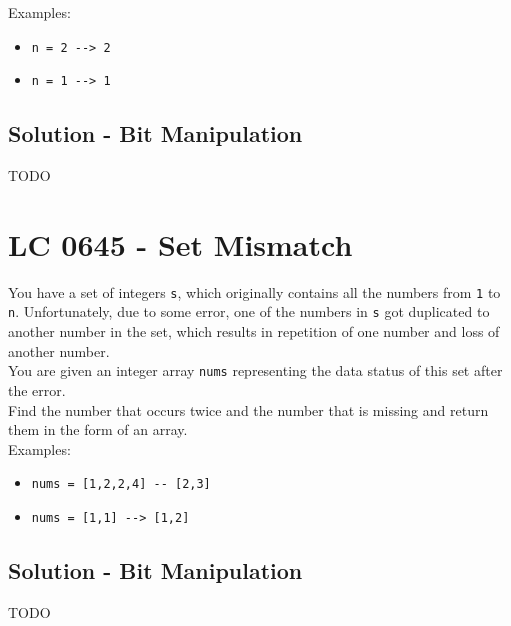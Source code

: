 Examples:
\begin{itemize}
\item {\colorbox{CodeBackground}{\lstinline|n = 2 --> 2|}}
\item {\colorbox{CodeBackground}{\lstinline|n = 1 --> 1|}}
\end{itemize}

\subsection*{Solution - Bit Manipulation}
TODO

\section{LC 0645 - Set Mismatch}
You have a set of integers {\colorbox{CodeBackground}{\lstinline|s|}}, which originally contains all the numbers from {\colorbox{CodeBackground}{\lstinline|1|}} to {\colorbox{CodeBackground}{\lstinline|n|}}. Unfortunately, due to some error, one of the numbers in {\colorbox{CodeBackground}{\lstinline|s|}} got duplicated to another number in the set, which results in repetition of one number and loss of another number.\\

You are given an integer array {\colorbox{CodeBackground}{\lstinline|nums|}} representing the data status of this set after the error.\\

Find the number that occurs twice and the number that is missing and return them in the form of an array.\\

Examples:
\begin{itemize}
\item {\colorbox{CodeBackground}{\lstinline|nums = [1,2,2,4] -- [2,3]|}}
\item {\colorbox{CodeBackground}{\lstinline|nums = [1,1] --> [1,2]|}}
\end{itemize}

\subsection*{Solution - Bit Manipulation}
TODO

